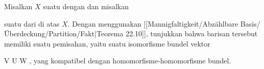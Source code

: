 \setcounter{section}{24}


{}
{

Misalkan $X$ suatu
dengan
dan misalkan

 {  }

suatu
dari
di atas $X$. Dengan menggunakan
[[Mannigfaltigkeit/Abzählbare Basis/Überdeckung/Partition/Fakt|Teorema 22.10]],
tunjukkan bahwa barisan tersebut memiliki suatu pemisahan, yaitu suatu isomorfisme bundel vektor

\mavergleichskette
{\vergleichskette
{ V
}
{ \cong }{ U \oplus W
}
{  }{
}
{    }{
}
{   }{
}
}
{}{}{,}
yang kompatibel dengan homomorfisme-homomorfisme bundel.

}
{} {}

